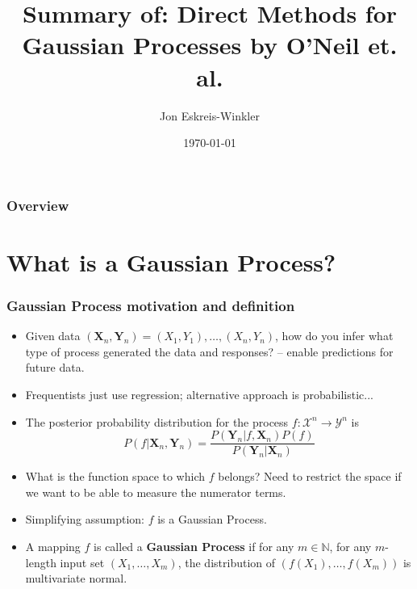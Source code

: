 \documentclass{beamer}
\title[Direct Methods for GPs]{Summary of: Direct Methods for Gaussian Processes by O'Neil et. al.} %
\author{Jon Eskreis-Winkler} %
\institute[UChicago] %
{
University of Chicago \\ %
\medskip
\textit{eskreiswinkler@uchicago.edu} %
}
\date{\today} %
\begin{document}
\begin{frame}
\titlepage %
\end{frame}

\begin{frame}
\frametitle{Overview} %
\tableofcontents %
\end{frame}


\section{What is a Gaussian Process?}%


\begin{frame}
\frametitle{Gaussian Process motivation and definition}

\begin{itemize}
\item Given data $(\textbf{X}_n, \textbf{Y}_n)=(X_1, Y_1), \dots, (X_n, Y_n)$, how do you infer what type of process generated the data and responses? -- enable predictions for future data.
\item Frequentists just use regression; alternative approach is probabilistic...
\item The posterior probability distribution for the process $f: \mathcal{X}^n \rightarrow \mathcal{Y}^n$ is 
$$P(f|\textbf{X}_n, \textbf{Y}_n) = \frac{P(\textbf{Y}_n|f, \textbf{X}_n)P(f)}{P(\textbf{Y}_n|\textbf{X}_n)}$$
\item What is the function space to which $f$ belongs? Need to restrict the space if we want to be able to measure the numerator terms.
\item Simplifying assumption: $f$ is a Gaussian Process.
\item A mapping $f$ is called a \textbf{Gaussian Process} if for any $m\in\mathbb{N}$, for any $m$-length  input set $(X_1, \dots, X_m)$, the distribution of $(f(X_1), \dots, f(X_m))$ is multivariate normal.
\end{itemize}
\end{frame}
\end{document}
